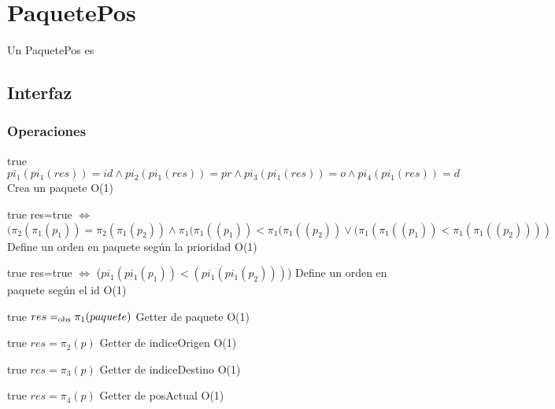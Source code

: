 \section{PaquetePos}

Un PaquetePos es

\subsection{Interfaz}



\subsubsection*{Operaciones}

 {true}
 {$pi_1(pi_1(res))=id \land pi_2(pi_1(res))=pr \land pi_3(pi_1(res))=o \land pi_4(pi_1(res))=d$}
 {Crea un paquete}
 {O(1)}
 {}
 
 {true}
 {res=true $\iff$ $(\pi_2(\pi_1(p_1)) = \pi_2(\pi_1(p_2)) \land \pi_1(\pi_1((p_1)) < \pi_1(\pi_1((p_2)) \lor (\pi_1(\pi_1((p_1)) < \pi_1(\pi_1((p_2))))$}
 {Define un orden en paquete seg\'un la prioridad}
 {O(1)}
 {}
 
 {true}
 {res=true $\iff$ ($pi_1(pi_1(p_1))<(pi_1(pi_1(p_2)))$)}
 {Define un orden en paquete seg\'un el id}
 {O(1)}
 {}
 
 {true}
 {$res =_{\mathrm{obs}} \pi_1(paquete)$}
 {Getter de paquete}
 {O(1)}
 {}
 
 {true}
 {$res = \pi_2(p)$}
 {Getter de indiceOrigen}
 {O(1)}
 {}
 
 {true}
 {$res = \pi_3(p)$}
 {Getter de indiceDestino}
 {O(1)}
 {}  
 
 {true}
 {$res = \pi_4(p)$}
 {Getter de posActual}
 {O(1)}
 {} 
  
